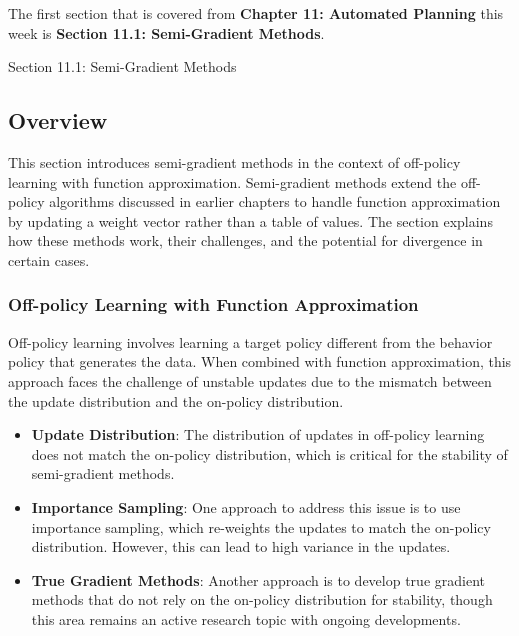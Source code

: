 The first section that is covered from \textbf{Chapter 11: Automated Planning} this week is \textbf{Section 11.1: Semi-Gradient Methods}.

\begin{notes}{Section 11.1: Semi-Gradient Methods}
    \subsection*{Overview}

    This section introduces semi-gradient methods in the context of off-policy learning with function approximation. Semi-gradient methods extend the off-policy algorithms discussed in earlier chapters to 
    handle function approximation by updating a weight vector rather than a table of values. The section explains how these methods work, their challenges, and the potential for divergence in certain cases.
    
    \subsubsection*{Off-policy Learning with Function Approximation}
    
    Off-policy learning involves learning a target policy different from the behavior policy that generates the data. When combined with function approximation, this approach faces the challenge of unstable 
    updates due to the mismatch between the update distribution and the on-policy distribution.
    
    \begin{highlight}
    
        \begin{itemize}
            \item \textbf{Update Distribution}: The distribution of updates in off-policy learning does not match the on-policy distribution, which is critical for the stability of semi-gradient methods.
            \item \textbf{Importance Sampling}: One approach to address this issue is to use importance sampling, which re-weights the updates to match the on-policy distribution. However, this can lead 
            to high variance in the updates.
            \item \textbf{True Gradient Methods}: Another approach is to develop true gradient methods that do not rely on the on-policy distribution for stability, though this area remains an active 
            research topic with ongoing developments.
        \end{itemize}
    

\end{highlight}
\end{notes}
